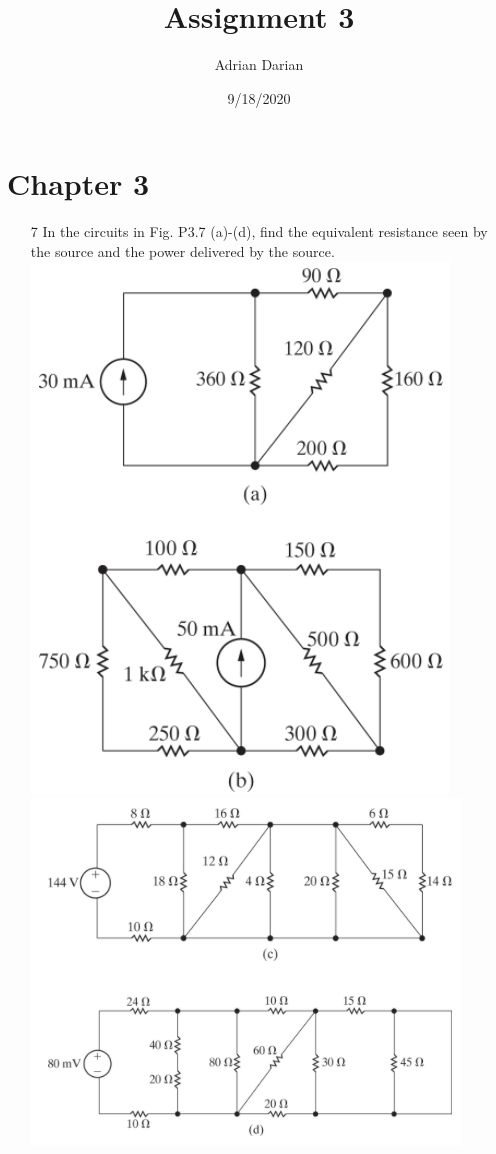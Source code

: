 \documentclass[a4paper]{article}
\title{Assignment 3}
\author{Adrian Darian}
\date{9/18/2020}
\begin{document}
  
\maketitle
  
\section*{Chapter 3}
\begin{itemize}
	\item[7] In the circuits in Fig. P3.7 (a)-(d), find the equivalent resistance seen by the source and the power delivered by the source. \\
	      \includegraphics[scale=0.5]{3-7-a-b.png} \\ 
	      \includegraphics[scale=0.5]{3-7-c-d.png} \\ 

\end{itemize}
\end{document}
